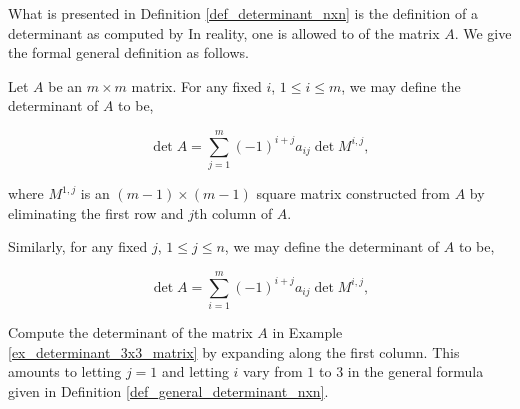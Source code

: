 What is presented in Definition \ref{def_determinant_nxn} is the definition of a determinant as computed by   In reality, one is allowed to  of the matrix $A$.  We give the formal general definition as follows.

{Let $A$ be an $m\times m$ matrix.  For any fixed $i$, $1\leq i\leq m$,  we may define the determinant of $A$ to be,
 
\[\det A = \sum_{j=1}^m (-1)^{i+j} a_{ij}\det M^{i,j},\]

\noindent where $M^{1,j}$ is an $(m-1)\times (m-1)$ square matrix constructed from $A$ by eliminating the first row and $j$th column of $A$.

Similarly, for any fixed $j$, $1\leq j\leq n$, we may define the determinant of $A$ to be,

\[\det A = \sum_{i=1}^m (-1)^{i+j} a_{ij}\det M^{i,j},\]
}

{Compute the determinant of the matrix $A$ in Example \ref{ex_determinant_3x3_matrix} by expanding along the first column.}
{This amounts to letting $j=1$ and letting $i$ vary from $1$ to $3$ in the general formula given in Definition \ref{def_general_determinant_nxn}.}








